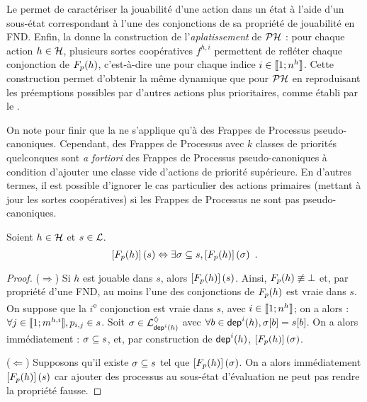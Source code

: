 Le  permet de caractériser la jouabilité d'une action dans un état
à l'aide d'un sous-état correspondant à l'une des conjonctions de sa propriété
de jouabilité en FND.
Enfin, la  donne la construction de l'\emph{aplatissement} de $\mathcal{PH}$ :
pour chaque action $h \in \mathcal{H}$, plusieurs sortes coopératives $f^{h,i}$
permettent de refléter chaque conjonction de $F_{p}(h)$,
c'est-à-dire une pour chaque indice $i \in \llbracket 1; n^{h} \rrbracket$.
Cette construction permet d'obtenir la même dynamique que pour $\mathcal{PH}$ en reproduisant
les préemptions possibles par d'autres actions plus prioritaires,
comme établi par le .

On note pour finir que la  ne s'applique qu'à des Frappes de Processus
pseudo-canoniques. Cependant, des Frappes de Processus avec $k$ classes de priorités quelconques
sont \textit{a fortiori} des Frappes de Processus pseudo-canoniques à condition d'ajouter
une classe vide d'actions de priorité supérieure.
En d'autres termes, il est possible d'ignorer le cas particulier des actions primaires
(mettant à jour les sortes coopératives) si les Frappes de Processus ne sont pas
pseudo-canoniques.


\begin{lemma}
  Soient $h \in \mathcal{H}$ et $s \in \mathcal{L}$.
  \[\left[F_{p}(h)\right](s) \Leftrightarrow
    \exists \sigma \subseteq s, \left[F_{p}(h)\right](\sigma) \enspace.\]
\end{lemma}
%
\begin{proof}
  ($\Rightarrow$)
    Si $h$ est jouable dans $s$, alors $\left[F_{p}(h)\right](s)$.
    Ainsi, $F_{p}(h) \not\equiv \bot$ et, par propriété d'une FND,
    au moins l'une des conjonctions de $F_{p}(h)$ est vraie dans $s$.
    On suppose que la $i$\textsuperscript{e} conjonction est vraie dans $s$,
    avec $i \in \llbracket 1; n^{h} \rrbracket$;
    on a alors : $\forall j \in \llbracket 1; m^{h,i} \rrbracket, p_{i,j} \in s$.
    Soit $\sigma \in \mathcal{L}^\lozenge_{\mathsf{dep}^{i}(h)}$
    avec $\forall b \in \mathsf{dep}^{i}(h), {\sigma[b]} = {s[b]}$.
    On a alors immédiatement : $\sigma \subseteq s$,
    et, par construction de $\mathsf{dep}^{i}(h)$, $\left[F_{p}(h)\right](\sigma)$.
  
  ($\Leftarrow$)
    Supposons qu'il existe $\sigma \subseteq s$ tel que $\left[F_{p}(h)\right](\sigma)$.
    On a alors immédiatement $\left[F_{p}(h)\right](s)$ car ajouter des processus au sous-état
    d'évaluation ne peut pas rendre la propriété fausse.
\end{proof}

